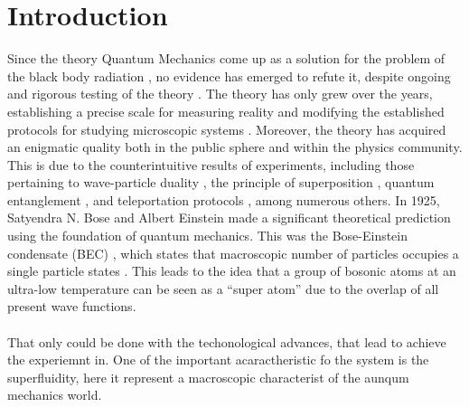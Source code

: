 \chapter{Introduction}
Since the theory Quantum Mechanics come up as a solution for the problem of the black body radiation \cite{Planck1901-rt, griffiths2018quantum}, no evidence has emerged to refute it, despite ongoing and rigorous testing of the theory \cite{Aspect-Experimental-Test,Bell-On-The,Mermin-Hidden-Variable}. The theory has only grew over the years, establishing a precise scale for measuring reality \cite{heisenberg1927uncertainty} and modifying the established protocols for studying microscopic systems \cite{bohr1928quantum, cohen1977quantum}.  Moreover, the theory has acquired an enigmatic quality both in the public sphere and within the physics community. This is due to the counterintuitive results of experiments, including those pertaining to wave-particle duality \cite{Wave-Particle}, the principle of superposition \cite{dirac1981principles-Superposition}, quantum entanglement \cite{Bell-Aspect-2004-Quantum-Entanglement}, and teleportation protocols \cite{Bennett1993-quantum-teleportation}, among numerous others. In 1925, Satyendra N. Bose and Albert Einstein made a significant theoretical prediction using the foundation of quantum mechanics. This was the Bose-Einstein condensate (BEC) \cite{bose1924plancks-BOSE1,einstein1925quantentheorie-BOSE2}, which states that macroscopic number of particles  occupies a single particle states \cite{Quantum-Liquids}. This leads to the idea that a group of bosonic atoms at an ultra-low temperature can be seen as a ``super atom'' due to the overlap of all present wave functions.\\ \\
That only could be done with the techonological advances, that lead to achieve the experiemnt in. One of the important acaractheristic fo the system is the superfluidity, here it represent a macroscopic characterist of the aunqum mechanics world.



